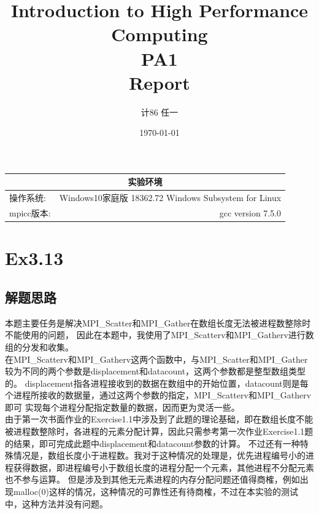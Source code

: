 \documentclass[UTF8]{article}
\title{\textbf{Introduction to High Performance Computing} \\ \textbf{PA1} \\ \textbf{Report}} %
\author{计86 \quad 任一\quad 2018011423} %
\date{\today} %
\begin{document}
\maketitle %


\begin{center}
    \begin{tabular}{l  r}
    \hline

        \multicolumn{2}{c}{实验环境} \\ \hline
        操作系统: & Windows10家庭版 18362.72 Windows Subsystem for Linux \\ \hline%
        mpicc版本: & gcc version 7.5.0 \\ \hline%


    \end{tabular}
\end{center}


\newpage


\section{Ex3.13}
\subsection{解题思路}
本题主要任务是解决MPI\_Scatter和MPI\_Gather在数组长度无法被进程数整除时不能使用的问题，
因此在本题中，我使用了MPI\_Scatterv和MPI\_Gatherv进行数组的分发和收集。\\


在MPI\_Scatterv和MPI\_Gatherv这两个函数中，与MPI\_Scatter和MPI\_Gather较为不同的两个参数是displacement和datacount，这两个参数都是整型数组类型的。
displacement指各进程接收到的数据在数组中的开始位置，datacount则是每个进程所接收的数据量，通过这两个参数的指定，MPI\_Scatterv和MPI\_Gatherv即可
实现每个进程分配指定数量的数据，因而更为灵活一些。 \\


由于第一次书面作业的Exercise1.1中涉及到了此题的理论基础，即在数组长度不能被进程数整除时，各进程的元素分配计算，因此只需参考第一次作业Exercise1.1题的结果，即可完成此题中displacement和datacount参数的计算。
不过还有一种特殊情况是，数组长度小于进程数。我对于这种情况的处理是，优先进程编号小的进程获得数据，即进程编号小于数组长度的进程分配一个元素，其他进程不分配元素也不参与运算。
但是涉及到其他无元素进程的内存分配问题还值得商榷，例如出现malloc(0)这样的情况，这种情况的可靠性还有待商榷，不过在本实验的测试中，这种方法并没有问题。
\end{document}
